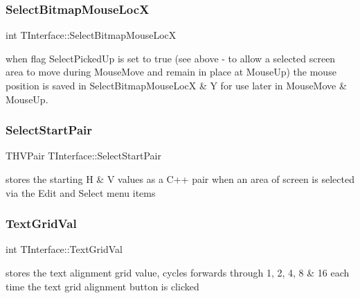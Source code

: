\subsubsection{\texorpdfstring{Select\+Bitmap\+Mouse\+LocX}{SelectBitmapMouseLocX}}
{\footnotesize\ttfamily int T\+Interface\+::\+Select\+Bitmap\+Mouse\+LocX\hspace{0.3cm}{\ttfamily [private]}}

when flag Select\+Picked\+Up is set to true (see above -\/ to allow a selected screen area to move during Mouse\+Move and remain in place at Mouse\+Up) the mouse position is saved in Select\+Bitmap\+Mouse\+LocX \& Y for use later in Mouse\+Move \& Mouse\+Up. \mbox{\label{class_t_interface_a3e24148c477fe9d15568da4ae3f91204}} 
\subsubsection{\texorpdfstring{Select\+Start\+Pair}{SelectStartPair}}
{\footnotesize\ttfamily T\+H\+V\+Pair T\+Interface\+::\+Select\+Start\+Pair\hspace{0.3cm}{\ttfamily [private]}}

stores the starting \textquotesingle{}H\textquotesingle{} \& \textquotesingle{}V\textquotesingle{} values as a C++ pair when an area of screen is selected via the \textquotesingle{}Edit\textquotesingle{} and \textquotesingle{}Select\textquotesingle{} menu items \mbox{\label{class_t_interface_a86dddbbcc24c740334718b1b80082c0d}} 
\subsubsection{\texorpdfstring{Text\+Grid\+Val}{TextGridVal}}
{\footnotesize\ttfamily int T\+Interface\+::\+Text\+Grid\+Val\hspace{0.3cm}{\ttfamily [private]}}

stores the text alignment grid value, cycles forwards through 1, 2, 4, 8 \& 16 each time the text grid alignment button is clicked \mbox{\label{class_t_interface_aae335c69e96b9210f28225f562e50c4d}} 
